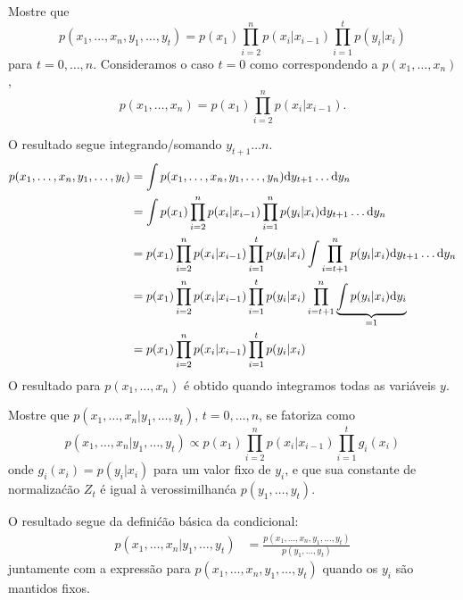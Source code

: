 \begin{exenumerate}
    
    \item Mostre que
    \begin{equation}
        p(x_1, \ldots, x_n, y_1, \ldots, y_t) =  p(x_1) \prod_{i=2}^n p(x_i|x_{i-1}) \prod_{i=1}^t p(y_i|x_i)
    \end{equation}
    para $t=0, \ldots, n$. Consideramos o caso $t=0$ como correspondendo a $p(x_1, \ldots, x_n)$,
    \begin{equation}
        p(x_1, \ldots, x_n) =  p(x_1) \prod_{i=2}^n p(x_i|x_{i-1}).
    \end{equation}
    
    \begin{solution}
        O resultado segue integrando/somando $y_{t+1} \ldots n$.
        \begin{align}
            p(x_1, \ldots, x_n, y_1, \ldots, y_t) & = \int p(x_1, \ldots, x_n, y_1, \ldots, y_n) \mathrm{d} y_{t+1} \ldots \mathrm{d} y_n \\
            & = \int  p(x_1) \prod_{i=2}^n p(x_i|x_{i-1}) \prod_{i=1}^n p(y_i|x_i)\mathrm{d} y_{t+1} \ldots \mathrm{d} y_n \\
            & =  p(x_1) \prod_{i=2}^n p(x_i|x_{i-1}) \prod_{i=1}^t p(y_i|x_i) \int  \prod_{i=t+1}^n p(y_i|x_i)\mathrm{d} y_{t+1} \ldots \mathrm{d} y_n \\
            &=  p(x_1) \prod_{i=2}^n p(x_i|x_{i-1}) \prod_{i=1}^t p(y_i|x_i)   \prod_{i=t+1}^n \underbrace{\int p(y_i|x_i)\mathrm{d} y_{i}}_{=1} \\
            & =  p(x_1) \prod_{i=2}^n p(x_i|x_{i-1}) \prod_{i=1}^t p(y_i|x_i)
        \end{align}
        O resultado para $p(x_1, \ldots, x_n)$ \'e obtido quando integramos todas as
        vari\'aveis $y$.
    \end{solution}
    
    \item Mostre que $p(x_1, \ldots, x_n | y_1, \ldots, y_t)$, $t=0,
    \ldots, n$, se fatoriza como
    \begin{equation}
        p(x_1, \ldots, x_n | y_1, \ldots, y_t) \propto  p(x_1) \prod_{i=2}^n p(x_i|x_{i-1}) \prod_{i=1}^t g_i(x_i)
        \label{eq:HMM-conditional-factorisation-alt}
    \end{equation}
    onde $g_i(x_i) = p(y_i|x_i)$ para um valor fixo de $y_i$, e que sua constante de normaliza\'c\~ao $Z_t$ \'e igual \`a verossimilhan\'ca $p(y_1, \ldots, y_t)$.
    
    \begin{solution}
        O resultado segue da defini\'c\~ao b\'asica da condicional:
        \begin{align}
            p(x_1, \ldots, x_n | y_1, \ldots, y_t) & = \frac{p(x_1, \ldots, x_n, y_1, \ldots, y_t)}{p(y_1, \ldots, y_t)}
        \end{align}
        juntamente com a express\~ao para $p(x_1, \ldots, x_n, y_1, \ldots, y_t)$ quando os $y_i$ s\~ao mantidos fixos.
    \end{solution}
    

\end{exenumerate}
